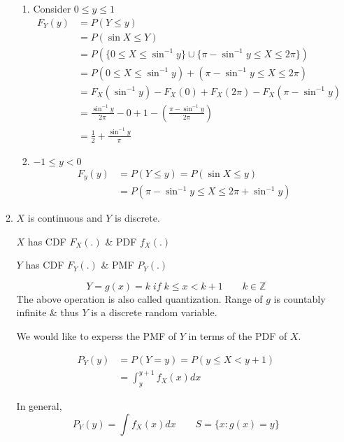 \documentclass{article}
\begin{document}
\begin{itemize}
\begin{enumerate}
        \begin{enumerate}
            \item Consider $0 \leq y \leq 1$
            \begin{align*}
                F_Y(y)&= P(Y \leq y) \\
                    &= P(\sin{X} \leq Y) \\
                    &= P(\{ 0 \leq X \leq \sin^{-1} y\} \cup \{ \pi - \sin^{-1}y \leq X \leq 2\pi \})\\
                    &=P( 0 \leq X \leq \sin^{-1}y)+(\pi - \sin^{-1}y \leq X \leq 2 \pi )\\
                    &= F_X(\sin^{-1}y)- F_X(0)+F_X(2\pi)- F_X(\pi - \sin^{-1}y)\\
                    &= \frac{\sin^{-1}y}{2\pi}-0+1- \left( \frac{\pi - \sin^{-1}y}{2\pi}\right) \\
                    &= \frac{1}{2}+ \frac{\sin^{-1}y}{\pi}
            \end{align*}
            \item $-1 \leq y <0$
            \begin{align*}
                F_y(y)&= P(Y \leq y) = P(\sin X \leq y)\\
                &= P(\pi - \sin^{-1}y \leq X \leq 2\pi + \sin^{-1}y )
            \end{align*}
        \end{enumerate}


    \item $X$ is continuous and $Y$ is discrete.

    $X$ has CDF $F_X(.)$ \& PDF $f_X(.)$

    $Y$ has CDF $F_Y(.)$ \& PMF $P_Y(.)$

    $$Y=g(x)=k \; if \; k \leq x < k+1 \qquad k \in \mathbb{Z} $$
    The above operation is also called quantization. Range of $g$ is countably infinite \& thus $Y$ is a discrete random variable.

    We would like to experss the PMF of $Y$ in terms of the PDF of $X$.


    \begin{align*}
        P_Y(y)&= P(Y=y)= P(y \leq X < y+1) \\
        &= \int_{y}^{y+1}f_X(x)dx
    \end{align*}

    In general,
    $$ P_Y(y)= \int f_X(x)dx \qquad S= \{ x: g(x)=y\}$$

    \end{enumerate}
\end{itemize}
\end{document}
